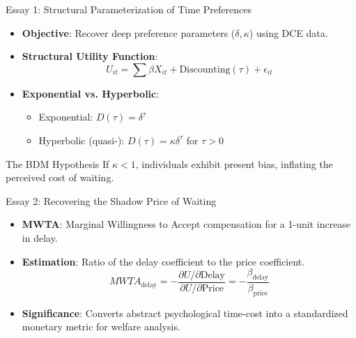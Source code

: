 \documentclass[10pt, aspectratio=169, xcolor={svgnames}]{beamer}
\begin{document}
\begin{frame}{Essay 1: Structural Parameterization of Time Preferences}
    \begin{itemize}
        \item \textbf{Objective}: Recover deep preference parameters ($\delta, \kappa$) using DCE data.
        \item \textbf{Structural Utility Function}:
            \[ U_{it} = \sum \beta X_{it} + \text{Discounting}(\tau) + \epsilon_{it} \]
        \item \textbf{Exponential vs. Hyperbolic}: 
            \begin{itemize}
                \item Exponential: $D(\tau) = \delta^\tau$
                \item Hyperbolic (quasi-): $D(\tau) = \kappa \delta^\tau$ for $\tau > 0$
            \end{itemize}
    \end{itemize}
    \begin{block}{The BDM Hypothesis}
        If $\kappa < 1$, individuals exhibit present bias, inflating the perceived cost of waiting.
    \end{block}
\end{frame}

\begin{frame}{Essay 2: Recovering the Shadow Price of Waiting}
    \begin{itemize}
        \item \textbf{MWTA}: Marginal Willingness to Accept compensation for a 1-unit increase in delay.
        \item \textbf{Estimation}: Ratio of the delay coefficient to the price coefficient.
            \[ MWTA_{\text{delay}} = - \frac{\partial U / \partial \text{Delay}}{\partial U / \partial \text{Price}} = - \frac{\beta_{\text{delay}}}{\beta_{\text{price}}} \]
        \item \textbf{Significance}: Converts abstract psychological time-cost into a standardized monetary metric for welfare analysis.
    \end{itemize}
\end{frame}
\end{document}
